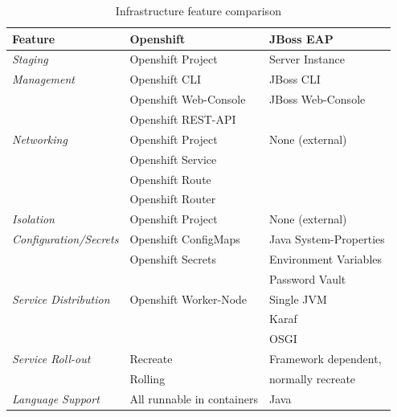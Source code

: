 {\renewcommand{\arraystretch}{1.2}%
\begin{table}[h]
	\begin{tabularx}{\textwidth}{ X|X|X }	
	  \textbf{Feature}                  & \textbf{Openshift}         & \textbf{JBoss EAP} \\  \hline
	  \textit{Staging}                  & Openshift Project          & Server Instance \\  \hline
	  \textit{Management}               & Openshift CLI              & JBoss CLI \\
	                                    & Openshift Web-Console      & JBoss Web-Console \\
	                                    & Openshift REST-API         & \\  \hline
	  \textit{Networking}               & Openshift Project          & None (external) \\
	                                    & Openshift Service          & \\  
	                                    & Openshift Route            & \\  
	                                    & Openshift Router           & \\  \hline
	  \textit{Isolation}                & Openshift Project          & None (external) \\  \hline
	  \textit{Configuration/Secrets}    & Openshift ConfigMaps       & Java System-Properties  \\
	                                    & Openshift Secrets          & Environment Variables \\
	                                                                && Password Vault \\  \hline
	  \textit{Service Distribution}     & Openshift Worker-Node      & Single JVM \\ 
			                                                        && Karaf \\  
			                                                        && OSGI \\  \hline
	  \textit{Service Roll-out}         & Recreate                   & Framework dependent, \\ 
			                            & Rolling                    & normally recreate \\ \hline
	  \textit{Language Support}         & All runnable in containers & Java \\
	\end{tabularx}
	\caption{Infrastructure feature comparison}
	\label{tab:esbd-multi-stage-env}
\end{table}}

